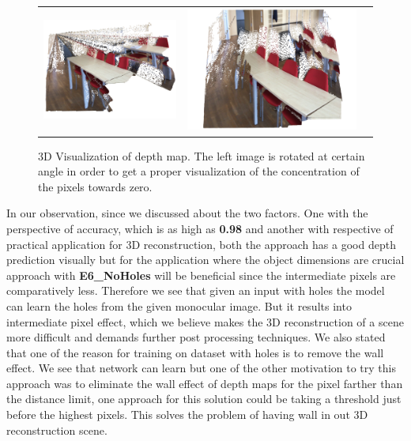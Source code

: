  \begin{figure}[!]
%
\centering\begin{tabular}{c@{ }c@{ }c@{ }}
\includegraphics[width=.5\linewidth]{Figures/results/3D/holes001.png}&
\includegraphics[width=.5\linewidth]{Figures/results/3D/noholes002.png}\\[-1ex]
\end{tabular}
\caption{3D Visualization of depth map. The left image is rotated at certain angle in order to get a proper visualization of the concentration of the pixels towards zero.}
\label{fig:3drecon}
\end{figure}

In our observation, since we discussed about the two factors. One with the perspective of accuracy, which is as high as \textbf{0.98} and another with respective of practical application for 3D reconstruction, both the approach has a good depth prediction visually but for the application where the object dimensions are crucial approach with \textbf{E6\_NoHoles} will be beneficial since the intermediate pixels are comparatively less. 
Therefore we see that given an input with holes the model can learn the holes from the given monocular image. But it results into intermediate pixel effect, which we believe makes the 3D reconstruction of a scene more difficult and demands further post processing techniques. We also stated that one of the reason for training on dataset with holes is to remove the wall effect. We see that network can learn but one of the other motivation to try this approach was to eliminate the wall effect of depth maps for the pixel farther than the distance limit, one approach for this solution could be taking a threshold just before the highest pixels. This solves the problem of having wall in out 3D reconstruction scene.\\


